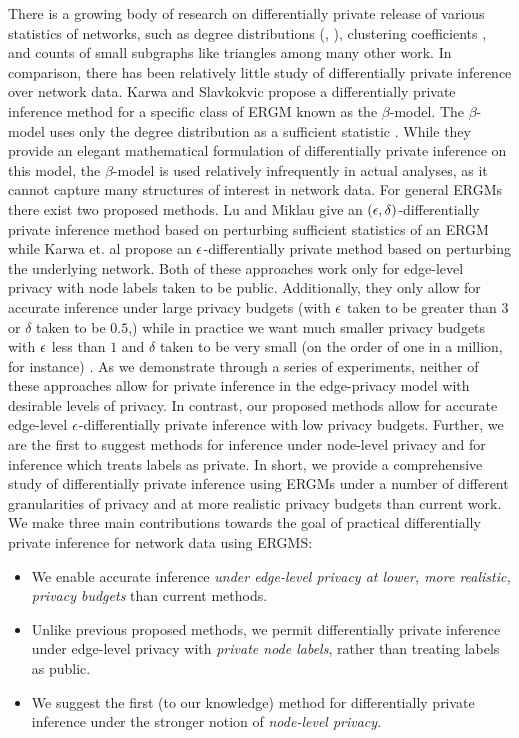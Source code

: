 There is a growing body of research on differentially private release of various statistics of networks, such as degree distributions (\cite{HLMJ09}, \cite{WNM16}), clustering coefficients \cite{WWZX12}, and counts of small subgraphs like triangles \cite{KRSY14} among many other work. In comparison, there has been relatively little study of differentially private inference over network data. Karwa and Slavkokvic propose a differentially private inference method for a specific class of ERGM known as the $\beta$-model. The $\beta$-model uses only the degree distribution as a sufficient statistic \cite{KS16}. While they provide an elegant mathematical formulation of differentially private inference on this model, the $\beta$-model is used relatively infrequently in actual analyses, as it cannot capture many structures of interest in network data. For general ERGMs there exist two proposed methods. Lu and Miklau \cite{LM14} give an $(\epsilon, \delta)$-differentially private inference method based on perturbing sufficient statistics of an ERGM while Karwa et. al \cite{KKS17} propose an $\epsilon$-differentially private method based on perturbing the underlying network. Both of these approaches work only for edge-level privacy with node labels taken to be public. Additionally, they only allow for accurate inference under large privacy budgets (with $\epsilon$ taken to be greater than $3$ or $\delta$ taken to be $0.5$,) while in practice we want much smaller privacy budgets with $\epsilon$ less than $1$ and $\delta$ taken to be very small (on the order of one in a million, for instance) \cite{N17}. As we demonstrate through a series of experiments, neither of these approaches allow for private inference in the edge-privacy model with desirable levels of privacy. In contrast, our proposed methods allow for accurate edge-level $\epsilon$-differentially private inference with low privacy budgets. Further, we are the first to suggest methods for inference under node-level privacy and for inference which treats labels as private. In short, we provide a comprehensive study of differentially private inference using ERGMs under a number of different granularities of privacy and at more realistic privacy budgets than current work. We make three main contributions towards the goal of practical differentially private inference for network data using ERGMS:
\begin{itemize}
	\item We enable accurate inference \emph{under edge-level privacy at lower, more realistic, privacy budgets} than current methods.
	\item Unlike previous proposed methods, we permit differentially private inference under edge-level privacy with \emph{private node labels}, rather than treating labels as public.
	\item We suggest the first (to our knowledge) method for differentially private inference under the stronger notion of \emph{node-level privacy}.
\end{itemize}

